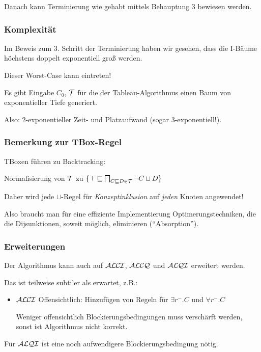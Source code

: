 Danach kann Terminierung wie gehabt mittels Behauptung 3 bewiesen werden.

\subsubsection{Komplexität}

Im Beweis zum 3. Schritt der Terminierung haben wir gesehen, dass die I-Bäume höchstens doppelt exponentiell groß werden.

Dieser Worst-Case kann eintreten!

\begin{lemma}
Es gibt Eingabe $C_0$, $\mathcal{T}$ für die der Tableau-Algorithmus einen Baum von exponentieller Tiefe generiert.
\end{lemma}

Also: 2-exponentieller Zeit- und Platzaufwand (sogar 3-exponentiell!).

\subsubsection{Bemerkung zur TBox-Regel}

TBoxen führen zu Backtracking:

\begin{center}Normalisierung von $\mathcal{T}$ zu $\{\top \sqsubseteq \bigsqcap_{C \sqsubseteq D \in \mathcal{T}} \neg C \sqcup D\}$\end{center}

Daher wird jede $\sqcup$-Regel für \emph{Konzeptinklusion} auf \emph{jeden} Knoten angewendet!

Also braucht man für eine effiziente Implementierung Optimerungstechniken, die die Dijsunktionen, soweit möglich, eliminieren (\enquote{Absorption}).

\subsubsection{Erweiterungen}

Der Algorithmus kann auch auf $\mathcal{A}\mathcal{L}\mathcal{C}\mathcal{I}$, $\mathcal{A}\mathcal{L}\mathcal{C}\mathcal{Q}$ und $\mathcal{A}\mathcal{L}\mathcal{Q}\mathcal{I}$ erweitert werden.

Das ist teilweise subtiler als erwartet, z.B.:

\begin{itemize}
	\item $\mathcal{A}\mathcal{L}\mathcal{C}\mathcal{I}$
	Offensichtlich: Hinzufügen von Regeln für $\exists r^{-}.C$ und $\forall r^-.C$

	Weniger offensichtlich Blockierungsbedingungen muss verschärft werden, sonst ist Algorithmus nicht korrekt.
\end{itemize}

Für $\mathcal{A}\mathcal{L}\mathcal{Q}\mathcal{I}$ ist eine noch aufwendigere Blockierungsbedingung nötig.

